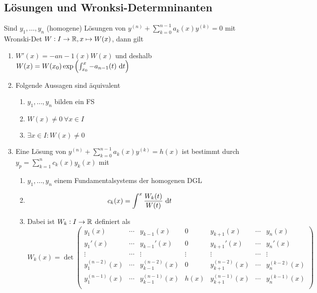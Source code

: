 \subsection{Lösungen und Wronksi-Determninanten}
Sind $y_1, \ldots, y_n$ (homogene) Lösungen von $y^{(n)} + \sum_{k=0}^{n-1} a_k(x) y^{(k)} = 0$ mit Wronski-Det $W: I \to \mathbb{R}, x\mapsto W(x)$,
dann gilt
\begin{enumerate}[label= (\alph*)]
	\item $W'(x) = -a{n-1}(x) W(x)$ und deshalb
		$W(x) = W(x_0) \exp \left( \int_{x_0}^x -a_{n-1}(t) \text{ d}t \right)$
	\item Folgende Aussagen sind äquivalent
		\begin{enumerate}
			\item $y_1, \ldots, y_n$ bilden ein FS
			\item $W(x) \neq 0\ \forall x \in I$
			\item $\exists x  \in I: W(x)  \neq 0$ 
		\end{enumerate}
	\item Eine Lösung von $y^{(n)} + \sum_{k=0}^{n-1} a_k(x) y^{(k)} = h(x)$ ist bestimmt durch
		$y_p = \sum_{k=1}^n c_k(x) y_k(x)$ mit
		\begin{enumerate}
			\item $y_1, \ldots, y_n$ einem Fundamentalsystems der homogenen DGL
			\item
				\begin{equation*}
					c_k(x) = \int^x  \frac{W_k(t)}{W(t)} \text{ d}t
				\end{equation*} 
			\item Dabei ist $W_k: I \to \mathbb{R}$ definiert als
				\begin{equation*}
					W_k(x) = \det \begin{pmatrix}
						y_1(x) & \cdots & y_{k-1}(x) & 0 & y_{k+1}(x) & \cdots & y_n(x) \\
						y_1'(x) & \cdots & y_{k-1}'(x) & 0 & y_{k+1}'(x) & \cdots & y_n'(x) \\
						\vdots & \cdots & \vdots & \vdots & \vdots & \cdots & \vdots \\
						y_1^{(n-2)}(x) & \cdots & y_{k-1}^{(n-2)}(x) & 0 & y_{k+1}^{(n-2)}(x) & \cdots & y_n^{(k-2)}(x)\\  
						y_1^{(n-1)}(x) & \cdots & y_{k-1}^{(n-1)}(x) & h(x) & y_{k+1}^{(n-1)}(x) & \cdots & y_n^{(k-1)}(x)\\  
					\end{pmatrix}
				\end{equation*}
		\end{enumerate}
\end{enumerate}